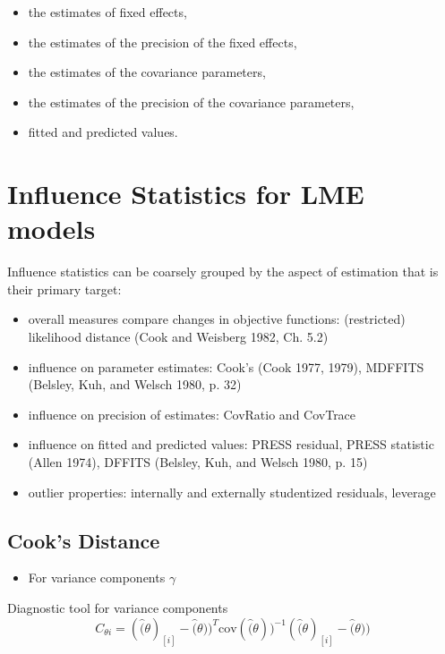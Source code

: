 \documentclass[Main.tex]{subfiles}
\begin{document}
		\begin{itemize}
			\item the estimates of fixed effects,
			\item the estimates of the precision of the fixed effects,
			\item the estimates of the covariance parameters,
			\item the estimates of the precision of the covariance parameters,
			\item fitted and predicted values.
		\end{itemize}
	

		

		
			
			
			

		
			\section{Influence Statistics for LME models} %
			Influence statistics can be coarsely grouped by the aspect of estimation that is their primary target:
			\begin{itemize}
				\item overall measures compare changes in objective functions: (restricted) likelihood distance (Cook and Weisberg 1982, Ch. 5.2)
				\item influence on parameter estimates: Cook's  (Cook 1977, 1979), MDFFITS (Belsley, Kuh, and Welsch 1980, p. 32)
				\item influence on precision of estimates: CovRatio and CovTrace
				\item influence on fitted and predicted values: PRESS residual, PRESS statistic (Allen 1974), DFFITS (Belsley, Kuh, and Welsch 1980, p. 15)
				\item outlier properties: internally and externally studentized residuals, leverage
			\end{itemize}


	
	\subsection{Cook's Distance} %
	\begin{itemize}
		\item For variance components $\gamma$
	\end{itemize}
	
	Diagnostic tool for variance components
	\[ C_{\theta i} =(\hat(\theta)_{[i]} - \hat(\theta))^{T}\mbox{cov}( \hat(\theta))^{-1}(\hat(\theta)_{[i]} - \hat(\theta))\]
	
\end{document}

